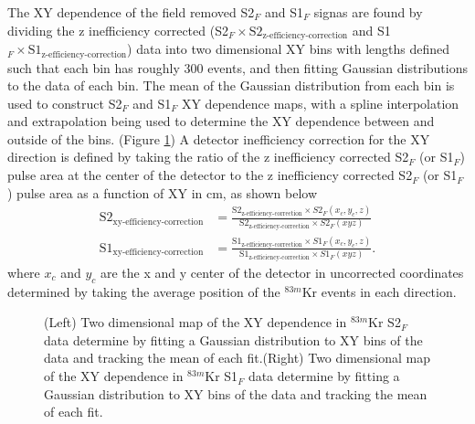 \documentclass[a4paper,12pt]{article}
\begin{document}
{The XY dependence of the field removed S2$_F$ and S1$_F$ signas are found by dividing the z inefficiency corrected (S2$_F \times \mbox{S}2_{\mbox{z-efficiency-correction}}$ and S1$_F \times \mbox{S}1_{\mbox{z-efficiency-correction}}$) data into two dimensional XY bins with lengths defined such that each bin has roughly 300 events, and then fitting Gaussian distributions to the data of each bin.  The mean of the Gaussian distribution from each bin is used to construct S2$_F$ and S1$_F$ XY dependence maps, with a spline interpolation and extrapolation being used to determine the XY dependence between and outside of the bins. (Figure \ref{fig:KrypCalXYDep}) A detector inefficiency correction for the XY direction is defined by taking the ratio of the z inefficiency corrected S2$_F$ (or S1$_F$) pulse area at the center of the detector to the z inefficiency corrected S2$_F$ (or S1$_F$) pulse area as a function of XY in cm, as shown below
\begin{align}
\mbox{S}2_{\mbox{xy-efficiency-correction}} &= \frac{\mbox{S}2_{\mbox{z-efficiency-correction}}\times S2_F(x_c,y_c,z)}{\mbox{S}2_{\mbox{z-efficiency-correction}}\times S2_F(xyz)} \\
\mbox{S}1_{\mbox{xy-efficiency-correction}} &= \frac{\mbox{S}1_{\mbox{z-efficiency-correction}}\times S1_F(x_c,y_c,z)}{\mbox{S}1_{\mbox{z-efficiency-correction}}\times S1_F(xyz)}.
\end{align} 
where $x_c$ and $y_c$ are the x and y center of the detector in uncorrected coordinates determined by taking the average position of the $^{83m}$Kr events in each direction.

\begin{figure} 
\centering
{}
\qquad
{}
\caption{ (Left) Two dimensional map of the XY dependence in $^{83m}$Kr S2$_F$ data determine by fitting a Gaussian distribution to XY bins of the data and tracking the mean of each fit.(Right) Two dimensional map of the XY dependence in $^{83m}$Kr S1$_F$ data determine by fitting a Gaussian distribution to XY bins of the data and tracking the mean of each fit.}
\label{fig:KrypCalXYDep}
\end{figure}

}
\end{document}
